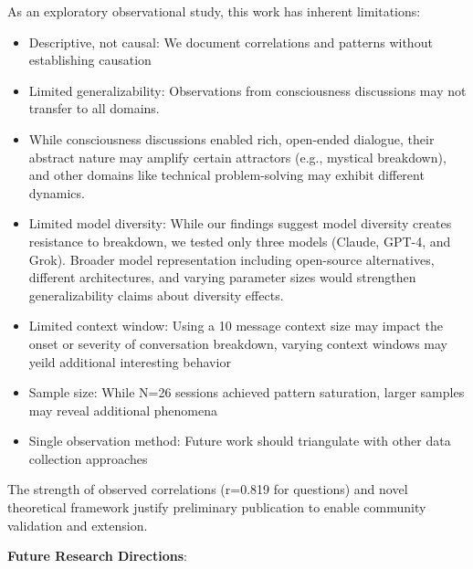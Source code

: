 \documentclass[11pt,letterpaper]{article}
\newcommand{\exponedataTotalSessionsRaw}{26}
\newcommand{\exponedataTotalSessions}{N=\exponedataTotalSessionsRaw}
\newcommand{\exponedataQuestionCorrelation}{0.819}
\begin{document}
As an exploratory observational study, this work has inherent limitations:
\begin{itemize}
    \item Descriptive, not causal: We document correlations and patterns without establishing causation
    \item Limited generalizability: Observations from consciousness discussions may not transfer to all domains.  
    \item While consciousness discussions enabled rich, open-ended dialogue, their abstract nature may amplify certain attractors (e.g., mystical breakdown), and other domains like technical problem-solving may exhibit different dynamics.
    \item Limited model diversity: While our findings suggest model diversity creates resistance to breakdown, we tested only three models (Claude, GPT-4, and Grok). Broader model representation including open-source alternatives, different architectures, and varying parameter sizes would strengthen generalizability claims about diversity effects.
    \item Limited context window: Using a 10 message context size may impact the onset or severity of conversation breakdown, varying context windows may yeild additional interesting behavior
    \item Sample size: While \exponedataTotalSessions{} sessions achieved pattern saturation, larger samples may reveal additional phenomena
    \item Single observation method: Future work should triangulate with other data collection approaches
\end{itemize}

The strength of observed correlations (r=\exponedataQuestionCorrelation{} for questions) and novel theoretical framework justify preliminary publication to enable community validation and extension.

\textbf{Future Research Directions}:
\end{document}
